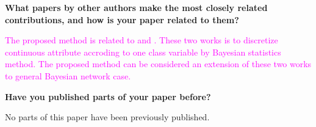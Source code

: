 \documentclass{article}
\newcommand{\todo}[1]{\textcolor{magenta}{#1}}
\begin{document}
\noindent
\textbf{What papers by other authors make the most closely related contributions, and how is your paper related to them?}

\todo{
The proposed method is related to \cite{Boulle_2006} and \cite{Lustgarten_2011}. These two works is to discretize continuous attribute accroding to one class variable by Bayesian statistics method. The proposed method can be considered an extension of these two works to general Bayesian network case.\\[0em]
}

\noindent
\textbf{Have you published parts of your paper before?}

No parts of this paper have been previously published.



\end{document}

